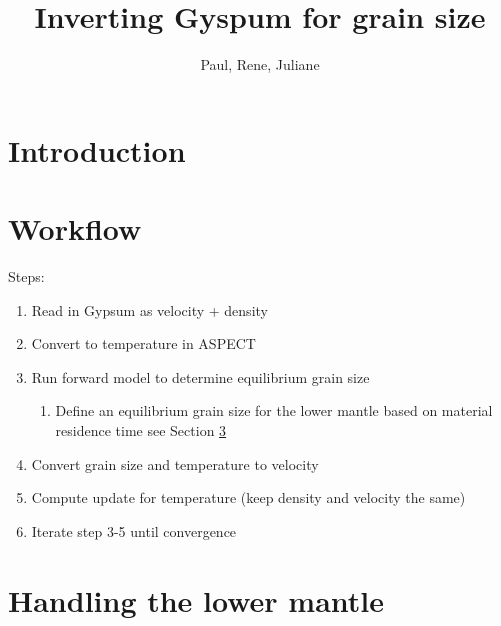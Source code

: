 \documentclass[draft, linenumbers]{article}
\begin{document}
\title{Inverting Gyspum for grain size}
\author{Paul, Rene, Juliane}

\maketitle


\begin{abstract}

\end{abstract}

\section{Introduction}
\label{sec:introduction}


\section{Workflow}

Steps:

\begin{enumerate}
\item Read in Gypsum as velocity + density
\item Convert to temperature in ASPECT
\item Run forward model to determine equilibrium grain size

\begin{enumerate}
\item Define an equilibrium grain size for the lower mantle based on material residence time see Section \ref{sec:lower_mantle_grain_size}
\end{enumerate}

\item Convert grain size and temperature to velocity
\item Compute update for temperature (keep density and velocity the same)
\item Iterate step 3-5 until convergence
\end{enumerate}



\section{Handling the lower mantle}
\label{sec:lower_mantle_grain_size}
\end{document}
